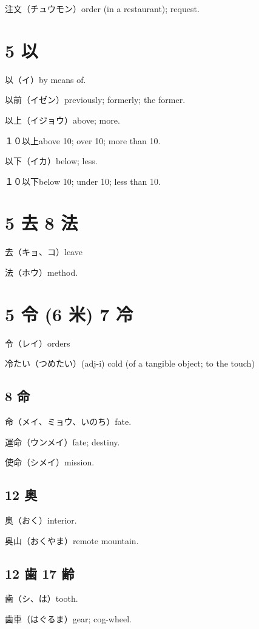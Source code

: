 注文（チュウモン）order (in a restaurant); request.

\section{5 以}

以（イ）by means of.

以前（イゼン）previously; formerly; the former.

以上（イジョウ）above; more.

１０以上above 10; over 10; more than 10.

以下（イカ）below; less.

１０以下below 10; under 10; less than 10.

\section{5 去 8 法}

去（キョ、コ）leave

法（ホウ）method.

\section{5 令 (6 米) 7 冷}

令（レイ）orders

冷たい（つめたい）(adj-i) cold (of a tangible object; to the touch)

\subsection{8 命}

命（メイ、ミョウ、いのち）fate.

運命（ウンメイ）fate; destiny.

使命（シメイ）mission.

\subsection{12 奥}

奥（おく）interior.

奥山（おくやま）remote mountain.

\subsection{12 歯 17 齢}

歯（シ、は）tooth.

歯車（はぐるま）gear; cog-wheel.

